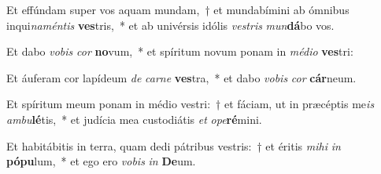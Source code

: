 \item Et effúndam super vos aquam mundam,~† et mundabímini ab ómnibus inqui\textit{na}\textit{mén}\textit{tis} \textbf{ves}tris,~* et ab univérsis idólis \textit{ves}\textit{tris} \textit{mun}\textbf{dá}bo vos.
\item Et dabo \textit{vo}\textit{bis} \textit{cor} \textbf{no}vum,~* et spíritum novum ponam in \textit{mé}\textit{di}\textit{o} \textbf{ves}tri:
\item Et áuferam cor lapídeum \textit{de} \textit{car}\textit{ne} \textbf{ves}tra,~* et dabo \textit{vo}\textit{bis} \textit{cor} \textbf{cár}neum.
\item Et spíritum meum ponam in médio vestri:~† et fáciam, ut in præcéptis me\textit{is} \textit{am}\textit{bu}\textbf{lé}tis,~* et judícia mea custodiátis \textit{et} \textit{o}\textit{pe}\textbf{ré}mini.
\item Et habitábitis in terra, quam dedi pátribus vestris:~† et éritis \textit{mi}\textit{hi} \textit{in} \textbf{pó}\textbf{pu}lum,~* et ego ero \textit{vo}\textit{bis} \textit{in} \textbf{De}um.
